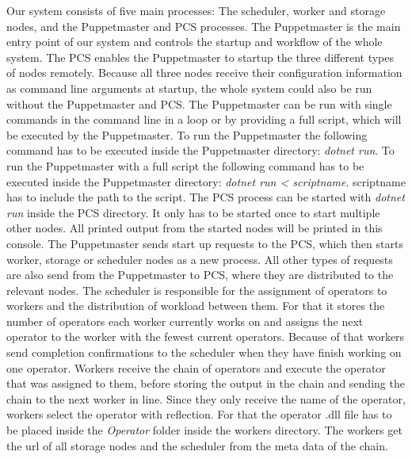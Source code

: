 \documentclass[times, 10pt,twocolumn]{article}
\begin{document}
Our system consists of five main processes: The scheduler, worker and storage nodes, and the Puppetmaster and PCS processes.
The Puppetmaster is the main entry point of our system and controls the startup and workflow of the whole system.
The PCS enables the Puppetmaster to startup the three different types of nodes remotely.
Because all three nodes receive their configuration information as command line arguments at startup, the whole system could also be run without the Puppetmaster and PCS.
The Puppetmaster can be run with single commands in the command line in a loop or by providing a full script, which will be executed by the Puppetmaster. \newline
To run the Puppetmaster the following command has to be executed inside the Puppetmaster directory:
\emph{dotnet run}. \newline
To run the Puppetmaster with a full script the following command has to be executed inside the Puppetmaster directory: 
\emph{dotnet run < scriptname}.
scriptname has to include the path to the script. \newline
The PCS process can be started with \emph{dotnet run} inside the PCS directory.
It only has to be started once to start multiple other nodes.
All printed output from the started nodes will be printed in this console.
The Puppetmaster sends start up requests to the PCS, which then starts worker, storage or scheduler nodes as a new process.
All other types of requests are also send from the Puppetmaster to PCS, where they are distributed to the relevant nodes. \newline
The scheduler is responsible for the assignment of operators to workers and the distribution of workload between them.
For that it stores the number of operators each worker currently works on and assigns the next operator to the worker with the fewest current operators.
Because of that workers send completion confirmations to the scheduler when they have finish working on one operator. \newline
Workers receive the chain of operators and execute the operator that was assigned to them, before storing the output in the chain and sending the chain to the next worker in line.
Since they only receive the name of the operator, workers select the operator with reflection.
For that the operator .dll file has to be placed inside the \emph{Operator} folder inside the workers directory.
The workers get the url of all storage nodes and the scheduler from the meta data of the chain.
\newline






\nocite{ex1,ex2}


\end{document}
